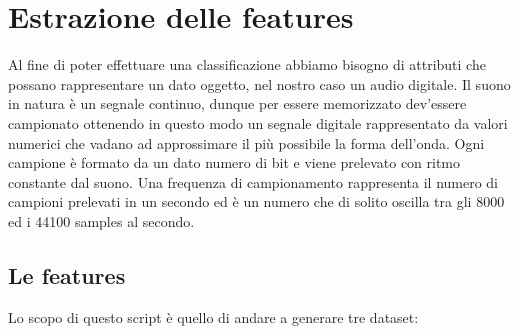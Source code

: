 \section{Estrazione delle features}
Al fine di poter effettuare una classificazione abbiamo bisogno di attributi che possano rappresentare un dato oggetto, nel nostro caso un audio digitale. Il suono in natura è un segnale continuo, dunque per essere memorizzato dev'essere campionato ottenendo in questo modo un segnale digitale rappresentato da valori numerici che vadano ad approssimare il più possibile la forma dell'onda. Ogni campione è formato da un dato numero di bit e viene prelevato con ritmo constante dal suono. Una frequenza di campionamento rappresenta il numero di campioni prelevati in un secondo ed è un numero che di solito oscilla tra gli 8000 ed i 44100 samples al secondo.
\subsection{Le features}
\label{par:feat}
Lo scopo di questo script è quello di andare a generare tre dataset: 

